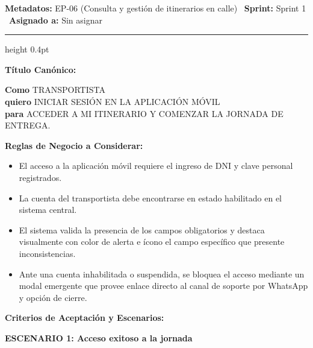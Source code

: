 \documentclass[a4paper,9pt]{article}
\begin{document}
\begin{tcolorbox}[hucard, title={\textbf{HU-23: INICIAR SESIÓN} \hfill \scriptsize \colorbox{tealstatus}{\textbf{\ Accepted\ }} \quad \colorbox{white}{\textcolor{primarydark}{\textbf{\ 2 pts\ }}}}]
\vspace{-1pt}
\noindent\textbf{\footnotesize Metadatos:} EP-06 (Consulta y gestión de itinerarios en calle) \textbar\ \textbf{Sprint:} Sprint 1 \textbar\ \textbf{Asignado a:} Sin asignar\par\vspace{2pt}
\hrule height 0.4pt\par\vspace{3pt}
\noindent\textbf{\footnotesize Título Canónico:}\par\vspace{1pt}
{\small \textbf{Como} TRANSPORTISTA \\ \textbf{quiero} INICIAR SESIÓN EN LA APLICACIÓN MÓVIL \\ \textbf{para} ACCEDER A MI ITINERARIO Y COMENZAR LA JORNADA DE ENTREGA.}\par\vspace{3pt}
\noindent\textbf{\footnotesize Reglas de Negocio a Considerar:}\par\vspace{1pt}
{\footnotesize
\begin{itemize}[leftmargin=12pt, nosep, itemsep=1.5pt, topsep=1pt]
\item El acceso a la aplicación móvil requiere el ingreso de DNI y clave personal registrados.
\item La cuenta del transportista debe encontrarse en estado habilitado en el sistema central.
\item El sistema valida la presencia de los campos obligatorios y destaca visualmente con color de alerta e ícono el campo específico que presente inconsistencias.
\item Ante una cuenta inhabilitada o suspendida, se bloquea el acceso mediante un modal emergente que provee enlace directo al canal de soporte por WhatsApp y opción de cierre.
\end{itemize}
}\par\vspace{3pt}
\noindent\textbf{\footnotesize Criterios de Aceptación y Escenarios:}\par\vspace{2pt}
{\footnotesize
\noindent\textbf{\textcolor{secondarydark}{ESCENARIO 1:  Acceso exitoso a la jornada}}\par\vspace{1pt}
}
\end{tcolorbox}
\end{document}

